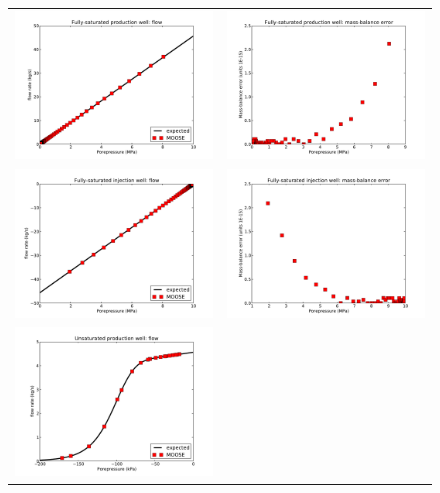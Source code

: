 \documentclass[]{scrreprt}
\begin{document}
\begin{figure}[htb]
\centering
\begin{tabular}{cc}
\includegraphics[width=7cm]{bh02_flow.pdf} &
\includegraphics[width=7cm]{bh02_error.pdf} \\
\includegraphics[width=7cm]{bh03_flow.pdf} &
\includegraphics[width=7cm]{bh03_error.pdf} \\
\includegraphics[width=7cm]{bh04_flow.pdf} &

\end{tabular}
\end{figure}
\end{document}
